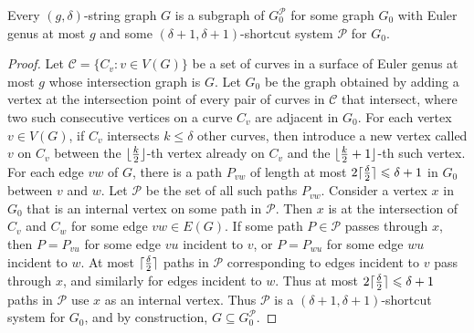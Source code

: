 \documentclass{patmorin}
\DeclarePairedDelimiter{\ceil}{\lceil}{\rceil}
\DeclarePairedDelimiter{\floor}{\lfloor}{\rfloor}
\newcommand{\PP}{\mathcal{P}}
\renewcommand{\leq}{\leqslant}
\begin{document}

\begin{lem}
\label{StringShortcut}
Every $(g,\delta)$-string graph $G$ is a subgraph of $G_0^\PP$ for some graph $G_0$ with Euler genus at most $g$ and some $(\delta+1,\delta+1 )$-shortcut system $\PP$ for $G_0$. 
\end{lem}

\begin{proof}
Let $\mathcal{C}=\{C_v:v\in V(G)\}$ be a set of curves in a surface of Euler genus at most $g$ whose intersection graph is $G$.  Let $G_0$ be the graph obtained by adding a vertex at the intersection point of every pair of curves in $\mathcal{C}$ that intersect,  where two such consecutive vertices on a curve $C_v$ are adjacent in $G_0$. For each vertex $v\in V(G)$, if $C_v$ intersects $k\leq\delta$ other curves, then introduce a new vertex called $v$ on $C_v$ between the 
$\floor{\frac{k}{2}}$-th vertex already on $C_v$ and the $\floor{\frac{k}{2}+1}$-th such vertex. For each edge $vw$ of $G$, there is a path $P_{vw}$ of length at most $2\ceil{\frac{\delta}{2}}\leq \delta+1$ in $G_0$ between $v$ and $w$. Let $\PP$ be the set of all such paths $P_{vw}$. Consider a vertex $x$ in $G_0$ that is an internal vertex on some path in $\PP$. Then $x$ is at the intersection of $C_v$ and $C_w$ for some edge $vw\in E(G)$. If some path $P\in \PP$ passes through $x$, then $P=P_{vu}$ for some edge $vu$ incident to $v$, or $P=P_{wu}$ for some edge $wu$ incident to $w$. At most $\ceil{\frac{\delta}{2}}$ paths in $\PP$ corresponding to edges incident to $v$ pass through $x$, and similarly for edges incident to $w$. Thus at most $2\ceil{\frac{\delta}{2}}\leq\delta+1$ paths in $\PP$ use $x$ as an internal vertex. Thus $\PP$ is a $(\delta+1,\delta+1)$-shortcut system for $G_0$, and by construction, $G \subseteq G_0^\PP$. 
\end{proof}
\end{document}
